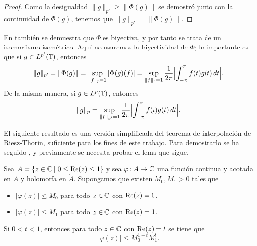 \documentclass[a4paper, 12pt, oneside]{book}
\begin{document}
\begin{proof}
    Como la desigualdad $\|g\|_{p'} \geq \|\Phi(g)\|$ se demostró junto con la continuidad de $\Phi(g)$, tenemos que $\|g\|_{p'} = \|\Phi(g)\|$.
\end{proof}

En \cite{folland} también se demuestra que $\Phi$ es biyectiva, y por tanto se trata de un isomorfismo isométrico. Aquí no usaremos la biyectividad de $\Phi$; lo importante es que si $g \in L^{p'}(\mathbb T)$, entonces
\[
    \|g\|_{p'} = \|\Phi(g)\| = \sup_{\|f\|_p = 1} |\Phi(g)(f)| = \sup_{\|f\|_p=1}\frac{1}{2\pi}\Bigl|\int_{-\pi}^{\pi} f(t)g(t) \, dt\Bigr|.
\]
De la misma manera, si $g\in L^p(\mathbb T)$, entonces
\begin{equation}\label{1.3.1}
    \|g\|_{p} = \sup_{\|f\|_{p'}=1}\frac{1}{2\pi}\Bigl|\int_{-\pi}^{\pi} f(t)g(t) \, dt\Bigr|.
\end{equation}

El siguiente resultado es una versión simplificada del teorema de interpolación de Riesz-Thorin, suficiente para los fines de este trabajo. Para demostrarlo se ha seguido \cite{folland}, y previamente se necesita probar el lema que sigue.

\begin{lemma}
    Sea $A = \{z \in \mathbb C \mid 0 \leq \textup{Re}(z) \leq 1\}$ y sea $\varphi \colon A \to \mathbb C$ una función continua y acotada en $A$ y holomorfa en $\mathring{A}$. Supongamos que existen $M_0,M_1>0$ tales que
    \begin{itemize}
        \item $|\varphi(z)| \leq M_0$ para todo $z \in \mathbb C$ con $\textup{Re}(z) = 0$.
        \item $|\varphi(z)| \leq M_1$ para todo $z \in \mathbb C$ con $\textup{Re}(z) = 1$.
    \end{itemize}
    Si $0 < t < 1$, entonces para todo $z \in \mathbb C$ con $\textup{Re}(z) = t$ se tiene que
    \[|\varphi(z)| \leq M_0^{1-t}M_1^t.\]
\end{lemma}
\end{document}
